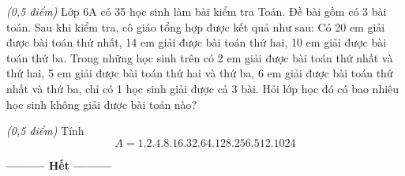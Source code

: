 \begin{ex}
\begin{enumerate}[a)]
\end{enumerate}
\end{ex}     \begin{ex}\textit{(0,5 điểm)} Lớp 6A có 35 học sinh làm bài kiểm tra Toán. Đề bài gồm có 3 bài toán. Sau khi kiểm tra, cô giáo tổng hợp được kết quả như sau:  Có 20 em giải được bài toán thứ nhất, 14 em giải được bài toán thứ hai, 10 em giải được bài toán thứ ba. Trong những học sinh trên có 2 em giải được bài toán thứ nhất và thứ hai, 5 em giải được bài toán thứ hai và thứ ba, 6 em giải được bài toán thứ nhất và thứ ba, chỉ có 1 học sinh  giải được cả 3 bài. Hỏi lớp học đó có bao nhiêu học sinh không giải được bài toán nào?\\
\end{ex}     \begin{ex}\textit{(0,5 điểm)} Tính 
\[A = 1.2.4.8.16.32.64.128.256.512.1024\]
\end{ex}
\begin{center}
\textbf{\textbf{---------} Hết \textbf{---------}}
\end{center}